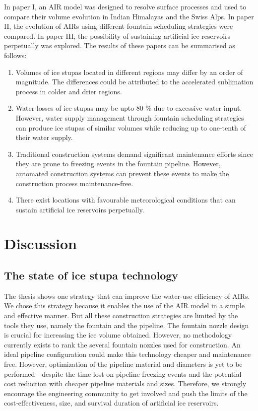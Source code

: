 In paper I, an AIR model was designed to resolve surface processes and used to compare their volume evolution
in Indian Himalayas and the Swiss Alps. In paper II, the evolution of AIRs using different fountain
scheduling strategies were compared. In paper III, the possibility of sustaining artificial ice reservoirs
perpetually was explored. The results of these papers can be summarised as follows:

\begin{enumerate} 

\item Volumes of ice stupas located in different regions may differ by an order of magnitude. The differences
  could be attributed to the accelerated sublimation process in colder and drier regions.

\item Water losses of ice stupas may be upto 80 \% due to excessive water input. However, water supply
  management through fountain scheduling strategies can produce ice stupas of similar volumes while reducing up to
  one-tenth of their water supply.

\item Traditional construction systems demand significant maintenance efforts since they are prone to freezing
  events in the fountain pipeline. However, automated construction systems can prevent these events to make the
  construction process maintenance-free.

\item There exist locations with favourable meteorological conditions that can sustain artificial ice reservoirs
  perpetually.

\end{enumerate}

\section{Discussion}

\subsection{The state of ice stupa technology}

The thesis shows one strategy that can improve the water-use efficiency of AIRs. We chose this strategy because
it enables the use of the AIR model in a simple and effective manner. But all these construction strategies are
limited by the tools they use, namely the fountain and the pipeline. The fountain nozzle design is crucial for
increasing the ice volume obtained. However, no methodology currently exists to rank the several fountain
nozzles used for construction. An ideal pipeline configuration could make this technology cheaper and
maintenance free. However, optimization of the pipeline material and diameters is yet to be performed---despite
the time lost on pipeline freezing events and the potential cost reduction with cheaper pipeline materials and
sizes. Therefore, we strongly encourage the engineering community to get involved and push the limits of the
cost-effectiveness, size, and survival duration of artificial ice reservoirs. 

